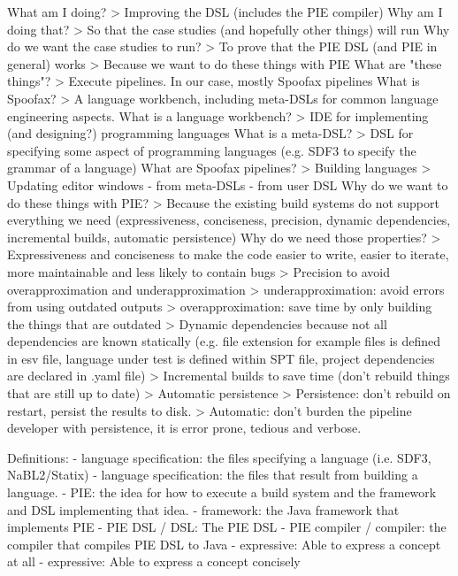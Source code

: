 What am I doing?
> Improving the DSL (includes the PIE compiler)
Why am I doing that?
> So that the case studies (and hopefully other things) will run
Why do we want the case studies to run?
> To prove that the PIE DSL (and PIE in general) works
> Because we want to do these things with PIE
What are "these things"?
> Execute pipelines. In our case, mostly Spoofax pipelines
What is Spoofax?
> A language workbench, including meta-DSLs for common language engineering aspects.
What is a language workbench?
> IDE for implementing (and designing?) programming languages
What is a meta-DSL?
> DSL for specifying some aspect of programming languages (e.g. SDF3 to specify the grammar of a language)
What are Spoofax pipelines?
> Building languages
> Updating editor windows
   - from meta-DSLs
   - from user DSL
Why do we want to do these things with PIE?
> Because the existing build systems do not support everything we need (expressiveness, conciseness, precision, dynamic dependencies, incremental builds, automatic persistence)
Why do we need those properties?
> Expressiveness and conciseness to make the code easier to write, easier to iterate, more maintainable and less likely to contain bugs
> Precision to avoid overapproximation and underapproximation
  > underapproximation: avoid errors from using outdated outputs
  > overapproximation: save time by only building the things that are outdated
> Dynamic dependencies because not all dependencies are known statically (e.g. file extension for example files is defined in esv file, language under test is defined within SPT file, project dependencies are declared in .yaml file)
> Incremental builds to save time (don't rebuild things that are still up to date)
> Automatic persistence
   > Persistence: don't rebuild on restart, persist the results to disk.
   > Automatic: don't burden the pipeline developer with persistence, it is error prone, tedious and verbose.


Definitions:
- language specification: the files specifying a language (i.e. SDF3, NaBL2/Statix)
- language specification: the files that result from building a language.
- PIE: the idea for how to execute a build system and the framework and DSL implementing that idea.
- framework: the Java framework that implements PIE
- PIE DSL / DSL: The PIE DSL
- PIE compiler / compiler: the compiler that compiles PIE DSL to Java
- expressive: Able to express a concept at all
- expressive: Able to express a concept concisely






